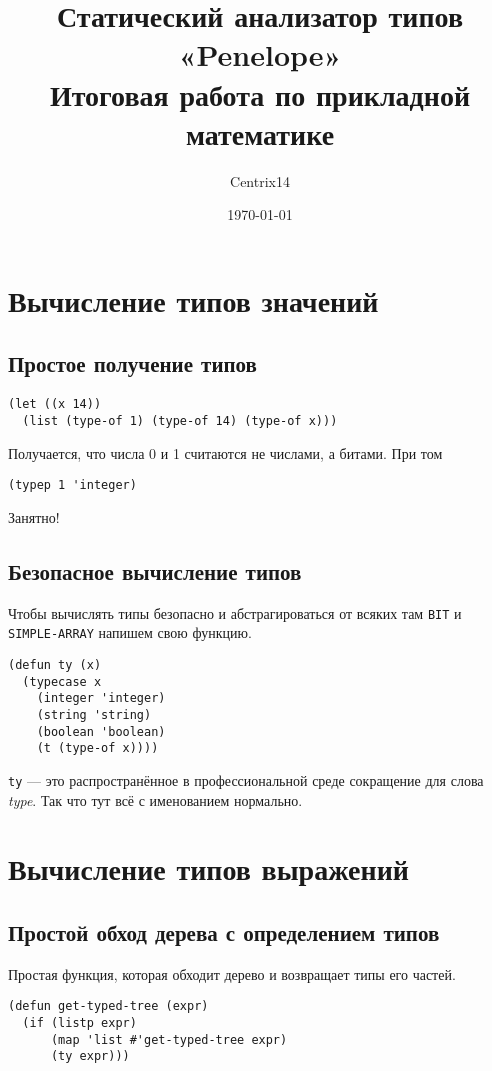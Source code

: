 \documentclass[a4paper,11pt]{article}
\author{Centrix14}
\date{\today}
\title{Статический анализатор типов «Penelope»\\\medskip
\large Итоговая работа по прикладной математике}
\begin{document}
\maketitle
\tableofcontents


\section{Вычисление типов значений}
\label{sec:orgcd85fea}
\subsection{Простое получение типов}
\label{sec:org10f08eb}
\begin{verbatim}
(let ((x 14))
  (list (type-of 1) (type-of 14) (type-of x)))
\end{verbatim}

Получается, что числа 0 и 1 считаются не числами, а битами. При том
\begin{verbatim}
(typep 1 'integer)
\end{verbatim}

Занятно!

\subsection{Безопасное вычисление типов}
\label{sec:orgcca81e1}
Чтобы вычислять типы безопасно и абстрагироваться от всяких там \texttt{BIT} и \texttt{SIMPLE-ARRAY} напишем свою функцию.

\begin{verbatim}
(defun ty (x)
  (typecase x
    (integer 'integer)
    (string 'string)
    (boolean 'boolean)
    (t (type-of x))))
\end{verbatim}

\texttt{ty} — это распространённое в профессиональной среде сокращение для слова \emph{type}. Так что тут всё с именованием нормально.

\section{Вычисление типов выражений}
\label{sec:orgfe437df}
\subsection{Простой обход дерева с определением типов}
\label{sec:orgaf38112}
Простая функция, которая обходит дерево и возвращает типы его частей.
\begin{verbatim}
(defun get-typed-tree (expr)
  (if (listp expr)
      (map 'list #'get-typed-tree expr)
      (ty expr)))
\end{verbatim}
\end{document}
